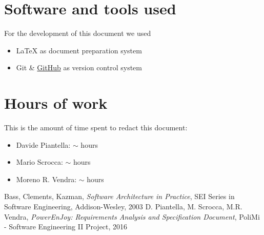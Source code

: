 \begin{appendices}

	\section{Software and tools used}
	For the development of this document we used
	\begin{itemize}
		\item \LaTeX{} as document preparation system
		\item Git \& \href{http://github.com}{GitHub} as version control system
	\end{itemize}
	
	\section{Hours of work}
	This is the amount of time spent to redact this document:
	\begin{itemize}
		\item Davide Piantella: $\sim$ hours
		\item Mario Scrocca: $\sim$ hours
		\item Moreno R. Vendra: $\sim$ hours
	\end{itemize}
	
\end{appendices}


\begin{thebibliography}{9}
Bass, Clements, Kazman, \emph{Software Architecture in Practice}, SEI Series in Software Engineering, Addison-­Wesley, 2003
D. Piantella, M. Scrocca, M.R. Vendra, \emph{PowerEnJoy: Requirements Analysis and Specification Document}, PoliMi - Software Engineering II Project, 2016
\end{thebibliography}